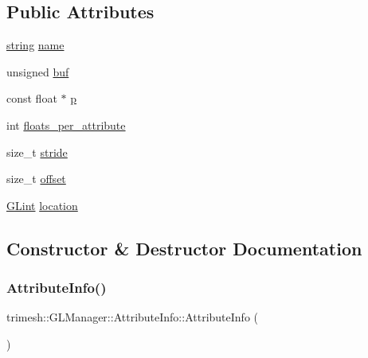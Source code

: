 \subsection*{Public Attributes}
\begin{DoxyCompactItemize}
\item 
\hyperlink{namespacetrimesh_a51b4a31323874089623d4b17afabc1aa}{string} \hyperlink{structtrimesh_1_1GLManager_1_1AttributeInfo_ad5055d910f9792131eb12f7597047d8d}{name}
\item 
unsigned \hyperlink{structtrimesh_1_1GLManager_1_1AttributeInfo_a8fbf13c65aa6d495a17d71310ace5c38}{buf}
\item 
const float $\ast$ \hyperlink{structtrimesh_1_1GLManager_1_1AttributeInfo_afb56efa61e786631d2a5f317617eb0b1}{p}
\item 
int \hyperlink{structtrimesh_1_1GLManager_1_1AttributeInfo_a02b42dc9c64212d889b9b3a5000ea826}{floats\+\_\+per\+\_\+attribute}
\item 
size\+\_\+t \hyperlink{structtrimesh_1_1GLManager_1_1AttributeInfo_ae0c6b5d9b0e8b622546b9ee9e71e7223}{stride}
\item 
size\+\_\+t \hyperlink{structtrimesh_1_1GLManager_1_1AttributeInfo_ae6132bf35d83e3dcac186e11b1d40919}{offset}
\item 
\hyperlink{namespacetrimesh_aeccc290e30b317c861fb146956528187}{G\+Lint} \hyperlink{structtrimesh_1_1GLManager_1_1AttributeInfo_a48ebfdc0482600561c164c4d62e25d1b}{location}
\end{DoxyCompactItemize}


\subsection{Constructor \& Destructor Documentation}
\mbox{\label{structtrimesh_1_1GLManager_1_1AttributeInfo_aab13a2c3c0f74ace19e917547916724d}} 
\subsubsection{\texorpdfstring{Attribute\+Info()}{AttributeInfo()}}
{\footnotesize\ttfamily trimesh\+::\+G\+L\+Manager\+::\+Attribute\+Info\+::\+Attribute\+Info (\begin{DoxyParamCaption}{ }\end{DoxyParamCaption})\hspace{0.3cm}{\ttfamily [inline]}}




